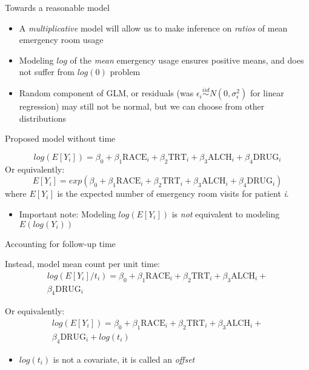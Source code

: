 \documentclass[ignorenonframetext,]{beamer}
\providecommand{\tightlist}{%
  \setlength{\itemsep}{0pt}\setlength{\parskip}{0pt}}
\begin{document}
\begin{frame}{Towards a reasonable model}
\protect\hypertarget{towards-a-reasonable-model}{}

\begin{itemize}
\tightlist
\item
  A \emph{multiplicative} model will allow us to make inference on
  \emph{ratios} of mean emergency room usage
\item
  Modeling \(log\) of the \emph{mean} emergency usage ensures positive
  means, and does not suffer from \(log(0)\) problem
\item
  Random component of GLM, or residuals (was
  \(\epsilon_i \stackrel{iid}{\sim} N(0, \sigma_\epsilon^2)\) for linear
  regression) may still not be normal, but we can choose from other
  distributions
\end{itemize}

\end{frame}

\begin{frame}{Proposed model without time}
\protect\hypertarget{proposed-model-without-time}{}

\[
log(E[Y_i]) = \beta_0 + \beta_1 \textrm{RACE}_i + \beta_2 \textrm{TRT}_i + \beta_3 \textrm{ALCH}_i + \beta_4 \textrm{DRUG}_i
\] Or equivalently: \[
E[Y_i] = exp \left( \beta_0 + \beta_1 \textrm{RACE}_i + \beta_2 \textrm{TRT}_i + \beta_3 \textrm{ALCH}_i + \beta_4 \textrm{DRUG}_i \right)
\] where \(E[Y_i]\) is the expected number of emergency room visits for
patient \emph{i}.

\begin{itemize}
\tightlist
\item
  Important note: Modeling \(log(E[Y_i])\) is \emph{not} equivalent to
  modeling \(E(log(Y_i))\)
\end{itemize}

\end{frame}

\begin{frame}{Accounting for follow-up time}
\protect\hypertarget{accounting-for-follow-up-time}{}

Instead, model mean count per unit time: \[
\begin{aligned}
log(E[Y_i]/t_i) = \beta_0 + \beta_1 \textrm{RACE}_i + \beta_2 \textrm{TRT}_i + 
\beta_3 \textrm{ALCH}_i + \nonumber \\ \beta_4 \textrm{DRUG}_i
\end{aligned}
\]

Or equivalently: \[
\begin{aligned}
log(E[Y_i]) = \beta_0 + \beta_1 \textrm{RACE}_i + \beta_2 \textrm{TRT}_i + 
\beta_3 \textrm{ALCH}_i + \nonumber \\ \beta_4 \textrm{DRUG}_i + log(t_i)
\end{aligned}
\]

\begin{itemize}
\tightlist
\item
  \(log(t_i)\) is not a covariate, it is called an \emph{offset}
\end{itemize}

\end{frame}
\end{document}
